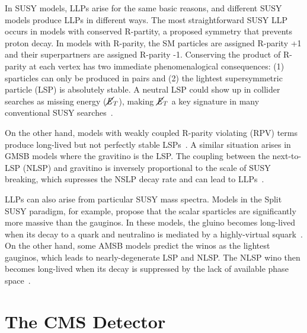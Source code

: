 \documentclass[12pt]{article}
\begin{document}
    In SUSY models, LLPs arise for the same basic reasons, and different SUSY models produce LLPs in different ways. The most straightforward SUSY LLP occurs in models with conserved R-partity, a proposed symmetry that prevents proton decay. In models with R-parity, the SM particles are assigned R-parity +1 and their superpartners are assigned R-parity -1. Conserving the product of R-parity at each vertex has two immediate phenomenalogical consequences: (1) sparticles can only be produced in pairs and (2) the lightest supersymmetric particle (LSP) is absolutely stable. A neutral LSP could show up in collider searches as missing energy ($\cancel{\it{E}}_{T}$), making $\cancel{\it{E}}_{T}$ a key signature in many conventional SUSY searches~\cite{primer}.

    On the other hand, models with weakly coupled R-parity violating (RPV) terms produce long-lived but not perfectly stable LSPs~\cite{fate}. A similar situation arises in GMSB models where the gravitino is the LSP. The coupling between the next-to-LSP (NLSP) and gravitino is inversely proportional to the scale of SUSY breaking, which supresses the NSLP decay rate and can lead to LLPs~\cite{dimopoulos_low_energy}.


    LLPs can also arise from particular SUSY mass spectra. Models in the Split SUSY paradigm, for example, propose that the scalar sparticles are significantly more massive than the gauginos. In these models, the gluino becomes long-lived when its decay to a quark and neutralino is mediated by a highly-virtual squark~\cite{kilian_split}.  On the other hand, some AMSB models predict the winos as the lightest gauginos, which leads to nearly-degenerate LSP and NLSP. The NLSP wino then becomes long-lived when its decay is suppressed by the lack of available phase space~\cite{randall_sundrum_out_of_this_world}.


\section{The CMS Detector}
\end{document}
